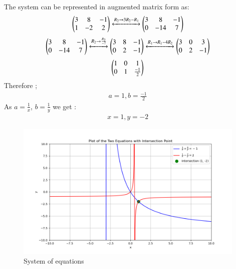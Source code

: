\documentclass[journal]{IEEEtran}
\begin{document}
The system can be represented in augmented matrix form as:
\begin{align}
\begin{pmatrix}3 & 8 & -1 \\
1 & -2 & 2\end{pmatrix}
\xleftrightarrow[]{R_2 \rightarrow {3R_2-R_1}}
\begin{pmatrix}3 & 8 & -1\\
0 & -14 & 7\end{pmatrix}
\end{align}
\begin{align}
   \begin{pmatrix}3 & 8 & -1\\
0 & -14 & 7\end{pmatrix}
\xleftrightarrow[]{R_2 \rightarrow {\frac{R_2}{-7}}}
\begin{pmatrix}3 & 8 & -1\\
0 & 2 & -1\end{pmatrix}
\xleftrightarrow[]{R_1 \rightarrow {R_1-4R_2}}
\begin{pmatrix}3 & 0 & 3\\
0 & 2 & -1\end{pmatrix}
\end{align}
\begin{align}
\begin{pmatrix}1 & 0 & 1\\
0 & 1 & \frac{-1}{2}\end{pmatrix}
\end{align}
Therefore ;
\begin{align}
    a = 1 , b = \frac{-1}{2}
\end{align}
As $a = \frac{1}{x}$, $ b = \frac{1}{y}$ we get :
\begin{align}
    x = 1 , y = -2
\end{align}
\begin{figure}[h!]
   \centering
   \includegraphics[width=0.7\linewidth]{figs/Q3.png}
   \caption{System of equations}
\end{figure}
\end{document}
